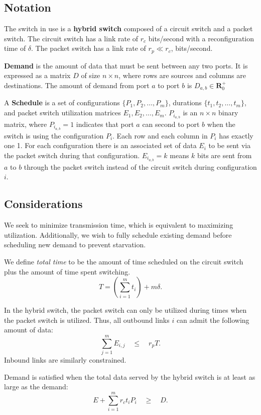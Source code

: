 \subsection{Notation}
The switch in use is a \textbf{hybrid switch} composed of
a circuit switch and a packet switch. The circuit switch has
a link rate of $r_c$ bits/second with a reconfiguration time of $\delta$.
The packet switch has a link rate of $r_p \ll r_c$, bits/second.

\textbf{Demand} is the amount of data that must be sent between any two ports.
It is expressed as a matrix $D$ of size $n \times n$,
where rows are sources and columns are destinations.
The amount of demand from port $a$ to port $b$ is $D_{a, b} \in \mathbf{R}^{+}_0$

A \textbf{Schedule} is a set of configurations $\{P_1, P_2, \dots, P_m\}$, durations
$\{t_1, t_2, \dots, t_m\}$, and packet switch utilization matrices ${E_1, E_2, \dots, E_m}$.
$P_{i_{a, b}}$ is an $n \times n$ binary matrix, where $P_{i_{a, b}} = 1$ indicates that
port $a$ can second to port $b$ when the switch is using the configuration $P_i$.
Each row and each column in $P_i$ has exactly one 1.
For each configuration there is an associated set of data $E_i$ to be sent via the
packet switch during that configuration.
$E_{i_{a, b}} = k$ means $k$ bits are sent from $a$ to $b$ through the packet switch instead
of the circuit switch during configuration $i$.


\subsection{Considerations}
We seek to minimize transmission time, which is equivalent to maximizing utilization.
Additionally, we wish to fully schedule existing demand before scheduling
new demand to prevent starvation.

We define {\it total time} to be the amount of time scheduled
on the circuit switch plus the amount of time spent switching.
\[T = \left(\sum_{i=1}^{m} t_i\right) + m\delta.\]

In the hybrid switch, the packet switch can only be utilized during times when
the packet switch is utilized. Thus, all outbound links $i$ can admit the following
amount of data:
\[\sum_{j=1}^{m} E_{i,j} \quad\leq\quad r_p T.\]
Inbound links are similarly constrained.

Demand is satisfied when the total data served by the hybrid switch is at least
as large as the demand:
\[E + \sum_{i=1}^{m} r_c t_i P_i \quad\geq\quad D.\]

